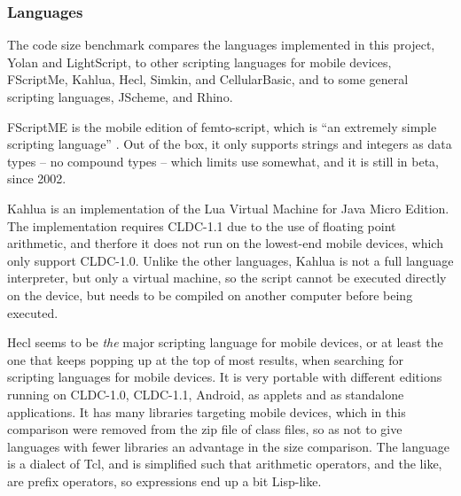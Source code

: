 \documentclass[11pt]{report}
\begin{document}

\subsubsection{Languages}
\label{codefootprint-languages}
The code size benchmark compares the languages implemented in this project, Yolan and LightScript, to other scripting languages for mobile devices, FScriptMe, Kahlua, Hecl, Simkin, and CellularBasic, and to some general scripting languages,  JScheme, and Rhino.

FScriptME \cite{fscriptme} is the mobile edition of femto-script, which is ``an extremely simple scripting language'' \cite{fscript}. 
Out of the box, it only supports strings and integers as data types -- no compound types -- which limits use somewhat, and it is still in beta, since 2002. 

Kahlua \cite{kahlua} is an implementation of the Lua Virtual Machine for Java Micro Edition. 
The implementation requires CLDC-1.1 due to the use of floating point arithmetic, and therfore it does not run on the lowest-end mobile devices, which only support CLDC-1.0.
Unlike the other languages, Kahlua is not a full language interpreter, but only a virtual machine, so the script cannot be executed directly on the device, but needs to be compiled on another computer before being executed.

Hecl \cite{hecl} seems to be \emph{the} major scripting language for mobile devices, or at least the one that keeps popping up at the top of most results, when searching for scripting languages for mobile devices.
It is very portable with different editions running on CLDC-1.0, CLDC-1.1, Android, as applets and as standalone applications.
It has many libraries targeting mobile devices, which in this comparison were removed from the zip file of class files, so as not to give languages with fewer libraries an advantage in the size comparison.
The language is a dialect of Tcl, and is simplified such that arithmetic operators, and the like, are prefix operators, so expressions end up a bit Lisp-like.
\end{document}
